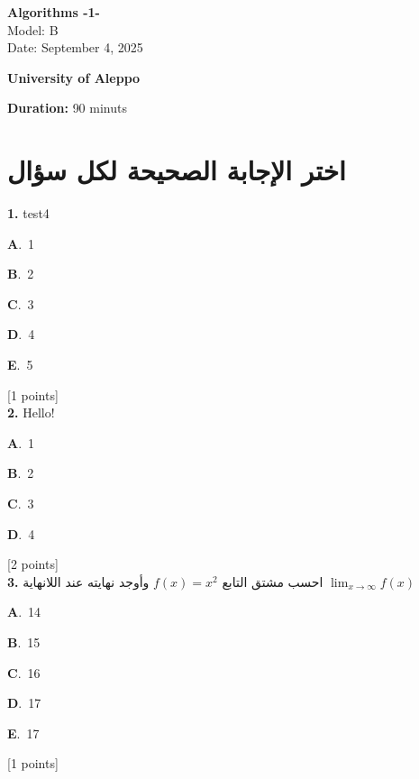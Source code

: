 \documentclass[12pt]{article}
\newcommand{\choice}[3]{%
  \noindent\textbf{#1}.~#2\hfill#3\par\vspace{0.25em}
}
\begin{document}
\begin{flushright}
{\Large \textbf{{\textenglish{Algorithms -1-}}}}\\[0.25em]
{\normalsize \textenglish{Model: }{\textenglish{B}}}\\[0.1em]
{\normalsize \textenglish{Date: }{\textenglish{September 4, 2025}}}
\end{flushright}

\vspace{0.6cm}

\noindent
\begin{minipage}[t]{0.65\textwidth}
  \raggedright
  \textbf{{\textenglish{University of Aleppo}}}\\[0.3em]
\end{minipage}\hfill
\begin{minipage}[t]{0.3\textwidth}
  \raggedleft
  \textenglish{\textbf{Duration: }}{\textenglish{90 minuts}}
\end{minipage}

\vspace{0.9cm}

\section*{اختر الإجابة الصحيحة لكل سؤال}

\noindent \textbf{\textenglish{1.}} {\textenglish{test4}}

\noindent\choice{A}{{\textenglish{1}}}{}
\noindent\choice{B}{{\textenglish{2}}}{}
\noindent\choice{C}{{\textenglish{3}}}{}
\noindent\choice{D}{{\textenglish{4}}}{}
\noindent\choice{E}{{\textenglish{5}}}{}
\hfill {\textenglish{[1 points]}}\\[0.5em]

\noindent \textbf{\textenglish{2.}} {\textenglish{Hello!}}

\noindent\choice{A}{{\textenglish{1}}}{}
\noindent\choice{B}{{\textenglish{2}}}{}
\noindent\choice{C}{{\textenglish{3}}}{}
\noindent\choice{D}{{\textenglish{4}}}{}
\hfill {\textenglish{[2 points]}}\\[0.5em]

\noindent \textbf{\textenglish{3.}} {\textarabic{احسب مشتق التابع }}\( f(x) = x^2\){\textarabic{ وأوجد نهايته عند اللانهاية }}\(\lim_{x \to \infty}f(x)\)

\noindent\choice{A}{{\textenglish{14}}}{}
\noindent\choice{B}{{\textenglish{15}}}{}
\noindent\choice{C}{{\textenglish{16}}}{}
\noindent\choice{D}{{\textenglish{17}}}{}
\noindent\choice{E}{{\textenglish{17}}}{}
\hfill {\textenglish{[1 points]}}\\[0.5em]
\end{document}
